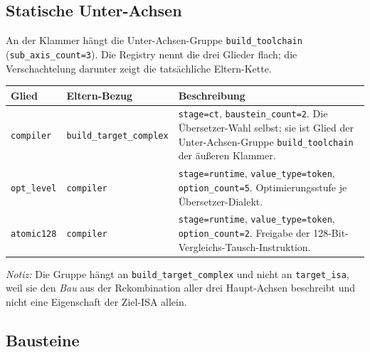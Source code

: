 \subsection*{Statische Unter-Achsen}

An der Klammer hängt die Unter-Achsen-Gruppe \texttt{build\_\allowbreak{}toolchain} (\texttt{sub\_\allowbreak{}axis\_\allowbreak{}count=3}). Die Registry nennt die drei Glieder flach; die Verschachtelung darunter zeigt die tatsächliche Eltern-Kette.

\begin{scriptsize}
\begin{longtable}{@{}>{\raggedright\arraybackslash}p{2.2cm} >{\raggedright\arraybackslash}p{3.4cm} >{\raggedright\arraybackslash}p{7.9cm}@{}}
\toprule
Glied & Eltern-Bezug & Beschreibung \\
\midrule
\endhead%
\texttt{compiler} & \texttt{build\_\allowbreak{}target\_\allowbreak{}complex} & \texttt{stage=ct}, \texttt{baustein\_\allowbreak{}count=2}. Die Übersetzer-Wahl selbst; sie ist Glied der Unter-Achsen-Gruppe \texttt{build\_\allowbreak{}toolchain} der äußeren Klammer. \\
\texttt{opt\_\allowbreak{}level} & \texttt{compiler} & \texttt{stage=runtime}, \texttt{value\_\allowbreak{}type=token}, \texttt{option\_\allowbreak{}count=5}. Optimierungsstufe je Übersetzer-Dialekt. \\
\texttt{atomic128} & \texttt{compiler} & \texttt{stage=runtime}, \texttt{value\_\allowbreak{}type=token}, \texttt{option\_\allowbreak{}count=2}. Freigabe der 128-Bit-Vergleichs-Tausch-Instruktion. \\
\bottomrule
\end{longtable}
\end{scriptsize}

\emph{Notiz:} Die Gruppe hängt an \texttt{build\_\allowbreak{}target\_\allowbreak{}complex} und nicht an \texttt{target\_\allowbreak{}isa}, weil sie den \emph{Bau} aus der Rekombination aller drei Haupt-Achsen beschreibt und nicht eine Eigenschaft der Ziel-ISA allein.

\subsection*{Bausteine}

